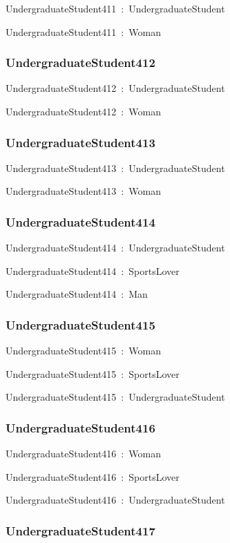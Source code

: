 \documentclass{article}
\begin{document}
UndergraduateStudent411~:~UndergraduateStudent

UndergraduateStudent411~:~Woman

\subsubsection*{UndergraduateStudent412}

UndergraduateStudent412~:~UndergraduateStudent

UndergraduateStudent412~:~Woman

\subsubsection*{UndergraduateStudent413}

UndergraduateStudent413~:~UndergraduateStudent

UndergraduateStudent413~:~Woman

\subsubsection*{UndergraduateStudent414}

UndergraduateStudent414~:~UndergraduateStudent

UndergraduateStudent414~:~SportsLover

UndergraduateStudent414~:~Man

\subsubsection*{UndergraduateStudent415}

UndergraduateStudent415~:~Woman

UndergraduateStudent415~:~SportsLover

UndergraduateStudent415~:~UndergraduateStudent

\subsubsection*{UndergraduateStudent416}

UndergraduateStudent416~:~Woman

UndergraduateStudent416~:~SportsLover

UndergraduateStudent416~:~UndergraduateStudent

\subsubsection*{UndergraduateStudent417}
\end{document}

